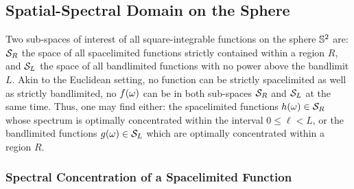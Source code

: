 \subsection{Spatial-Spectral Domain on the Sphere}\label{sec:chapter2_spatial_spectral_domain_sphere}

Two sub-spaces of interest of all square-integrable functions on the sphere \(\mathbb{S}^{2}{}\) are: \(\mathcal{S}_{R}{}\) the space of all spacelimited functions strictly contained within a region \(R\), and \(\mathcal{S}_{L}{}\) the space of all bandlimited functions with no power above the bandlimit \(L\).
Akin to the Euclidean setting, no function can be strictly spacelimited as well as strictly bandlimited, \ie{} no \(f(\omega)\) can be in both sub-spaces \(\mathcal{S}_{R}{}\) and \(\mathcal{S}_{L}{}\) at the same time.
Thus, one may find either: the spacelimited functions \(h(\omega) \in \mathcal{S}_{R}{}\) whose spectrum is optimally concentrated within the interval \(0 \leq \ell < L\), or the bandlimited functions \(g(\omega) \in \mathcal{S}_{L}{}\) which are optimally concentrated within a region \(R\).

\subsubsection{Spectral Concentration of a Spacelimited Function}

